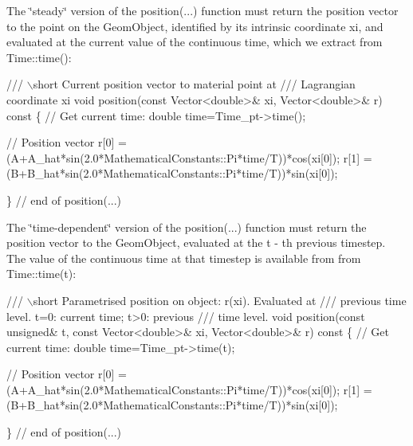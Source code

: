 The \char`\"{}steady\char`\"{} version of the {\ttfamily position}(...) function must return the position vector to the point on the {\ttfamily Geom\+Object}, identified by its intrinsic coordinate {\ttfamily xi}, and evaluated at the current value of the continuous time, which we extract from {\ttfamily Time\+::time()}\+: 
\begin{DoxyCodeInclude}
 \textcolor{comment}{/// \(\backslash\)short Current position vector to material point at }
\textcolor{comment}{ /// Lagrangian coordinate xi }
\textcolor{comment}{} \textcolor{keywordtype}{void} position(\textcolor{keyword}{const} Vector<double>& xi, Vector<double>& r)\textcolor{keyword}{ const}
\textcolor{keyword}{  }\{
   \textcolor{comment}{// Get current time:}
   \textcolor{keywordtype}{double} time=Time\_pt->time();

   \textcolor{comment}{// Position vector}
   r[0] = (A+A\_hat*sin(2.0*MathematicalConstants::Pi*time/T))*cos(xi[0]);
   r[1] = (B+B\_hat*sin(2.0*MathematicalConstants::Pi*time/T))*sin(xi[0]);

  \} \textcolor{comment}{// end of position(...)}

\end{DoxyCodeInclude}


The \char`\"{}time-\/dependent\char`\"{} version of the {\ttfamily position}(...) function must return the position vector to the {\ttfamily Geom\+Object}, evaluated at the {\ttfamily t} -\/ th previous timestep. The value of the continuous time at that timestep is available from from {\ttfamily Time\+::time(t)}\+: 
\begin{DoxyCodeInclude}
 \textcolor{comment}{/// \(\backslash\)short Parametrised position on object: r(xi). Evaluated at}
\textcolor{comment}{ /// previous time level. t=0: current time; t>0: previous}
\textcolor{comment}{}\textcolor{comment}{ /// time level.}
\textcolor{comment}{} \textcolor{keywordtype}{void} position(\textcolor{keyword}{const} \textcolor{keywordtype}{unsigned}& t, \textcolor{keyword}{const} Vector<double>& xi,
               Vector<double>& r)\textcolor{keyword}{ const}
\textcolor{keyword}{  }\{
   \textcolor{comment}{// Get current time:}
   \textcolor{keywordtype}{double} time=Time\_pt->time(t);
   
   \textcolor{comment}{// Position vector}
   r[0] = (A+A\_hat*sin(2.0*MathematicalConstants::Pi*time/T))*cos(xi[0]);
   r[1] = (B+B\_hat*sin(2.0*MathematicalConstants::Pi*time/T))*sin(xi[0]);

  \} \textcolor{comment}{// end of position(...)}

\end{DoxyCodeInclude}


